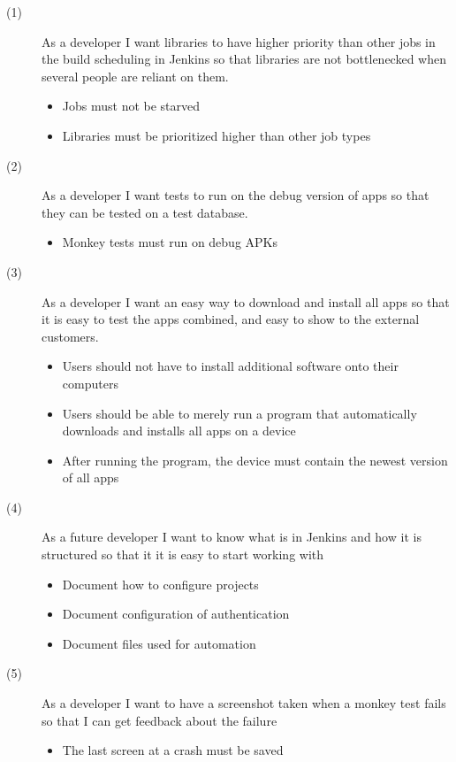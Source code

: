 \begin{description}
  \item[(1)] As a developer I want libraries to have higher priority than other jobs in the build scheduling in Jenkins so that libraries are not bottlenecked when several people are reliant on them.
  \begin{itemize}
    \item Jobs must not be starved
    \item Libraries must be prioritized higher than other job types
  \end{itemize}
  \item[(2)] As a developer I want tests to run on the debug version of apps so that they can be tested on a test database.
  \begin{itemize}
    \item Monkey tests must run on debug APKs
  \end{itemize}
  \item[(3)] As a developer I want an easy way to download and install all apps so that it is easy to test the apps combined, and easy to show to the external customers.
  \begin{itemize}
    \item Users should not have to install additional software onto their computers
    \item Users should be able to merely run a program that automatically downloads and installs all apps on a device
    \item After running the program, the device must contain the newest version of all apps
  \end{itemize}
  \item[(4)] As a future developer I want to know what is in Jenkins and how it is structured so that it it is easy to start working with
  \begin{itemize}
    \item Document how to configure projects
    \item Document configuration of authentication
    \item Document files used for automation
  \end{itemize}
  \item[(5)] As a developer I want to have a screenshot taken when a monkey test fails so that I can get feedback about the failure
  \begin{itemize}
    \item The last screen at a crash must be saved
  \end{itemize}
\end{description}

